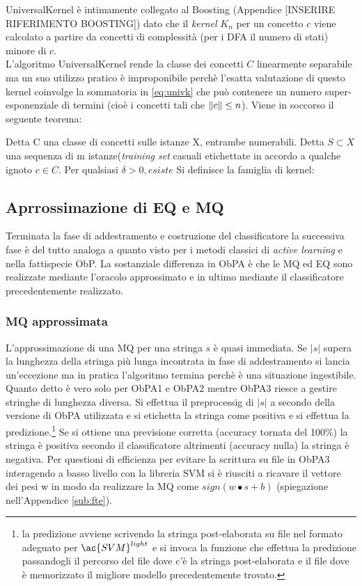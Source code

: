 UniversalKernel è intimamente collegato al Boosting (Appendice [INSERIRE RIFERIMENTO BOOSTING]) dato che il \textit{kernel} $K_n$ per un concetto $c$ viene calcolato a partire da concetti di complessità (per i \ac{DFA} il numero di stati) minore di $c$. \\

L'algoritmo UniversalKernel rende la classe dei concetti $C$ linearmente separabile ma un suo utilizzo pratico è improponibile  perchè l'esatta valutazione di questo kernel coinvolge la sommatoria in \eqref{eq:univk} che può contenere un numero super-esponenziale di termini (cioè i concetti tali che $\lVert c\rVert \leq n$). Viene in soccorso il seguente teorema:

\begin{teorema}
Detta C una classe di concetti sulle istanze X, entrambe numerabili. Detta $S \subset X$ una sequenza di m istanze(\textit{training set} casuali etichettate in accordo a qualche ignoto $c \in C$. Per qualsiasi $\delta > 0, esiste $ Si definisce la famiglia di kernel:
\end{teorema}



\subsection{Aprrossimazione di EQ e MQ}
Terminata la fase di addestramento e costruzione del classificatore la successiva fase  è  del tutto analoga a quanto visto per i metodi classici di \textit{active learning} e nella fattispecie \ac{ObP}. La sostanziale differenza in \ac{ObPA} è che le \ac{MQ} ed \ac{EQ} sono realizzate mediante l'oracolo approssimato e in ultimo mediante il classificatore precedentemente realizzato.
\subsubsection{MQ approssimata}
L'approssimazione di una \ac{MQ} per una stringa $s$ è quasi immediata. Se $|s|$ supera la lunghezza della stringa più lunga incontrata in fase di addestramento si lancia un'eccezione ma in pratica l'algoritmo termina perchè è una situazione ingestibile. Quanto detto è vero solo per \ac{ObPA}1 e \ac{ObPA}2 mentre \ac{ObPA}3 riesce a gestire stringhe di lunghezza diversa. Si effettua il preprocessig di $|s|$ a secondo della versione di \ac{ObPA} utilizzata e si etichetta la stringa come positiva e si effettua la predizione.\footnote{la predizione avviene scrivendo la stringa post-elaborata su file nel formato adeguato per $\ac{SVM}^{light}$ e si invoca la funzione che effettua la predizione passandogli il percorso del file dove c'è la stringa post-elaborata e il file dove è memorizzato il migliore modello precedentemente trovato.} Se si ottiene una previsione corretta (accuracy tornata del 100$\%$) la stringa è positiva secondo il classificatore altrimenti (accuracy nulla) la stringa è negativa. Per questioni di efficienza per evitare la scrittura su file in \ac{ObPA}3 interagendo a basso livello con la libreria \ac{SVM} si è riusciti a ricavare il vettore dei pesi w in modo da realizzare la \ac{MQ} come $sign(w \bullet s + b)$ (spiegazione nell'Appendice  \ref{sub:fte}).
 
